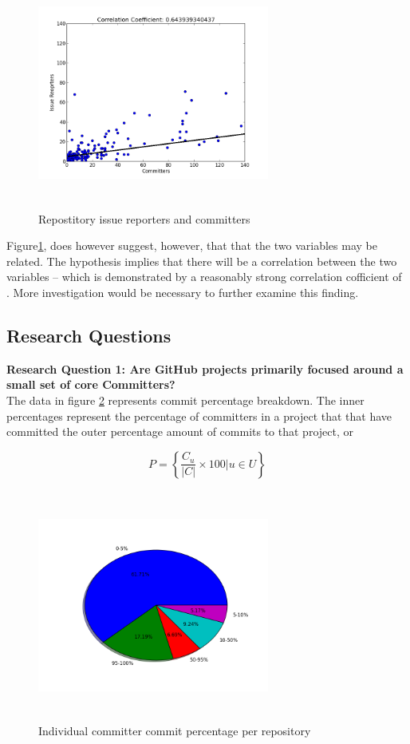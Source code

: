 \documentclass{proc}
\begin{document}
\begin{figure}
\includegraphics[height=3in,width=3in]{images/issue_reporters_committers_scatterplot.png}
\caption{Repostitory issue reporters and committers}
\label{fig:issue_reporters_committers_scatterplot}
\end{figure}

Figure\ref{fig:issue_reporters_committers_scatterplot}, does however suggest, however, that that the two variables may be related. The hypothesis implies that there will be a correlation between the two variables -- which is demonstrated by a reasonably strong correlation cofficient of . More investigation would be necessary to further examine this finding.\\

\subsection{Research Questions}
\textbf{Research Question 1: Are GitHub projects primarily focused around a small set of core Committers?}\\
The data in figure \ref{fig:committers_percentage_pie_chart} represents commit percentage breakdown. The inner percentages represent the percentage of committers in a project that that have committed the outer percentage amount of commits to that project, or

 \[ P = \left\{ \frac{ C_u } { |C| } \times 100 \Big| u \in U \right\} \]

\begin{figure}
\includegraphics[height=3in,width=3in]{images/committers_percentage_pie_chart.png}
\caption{Individual committer commit percentage per repository}
\label{fig:committers_percentage_pie_chart}
\end{figure}
\end{document}
